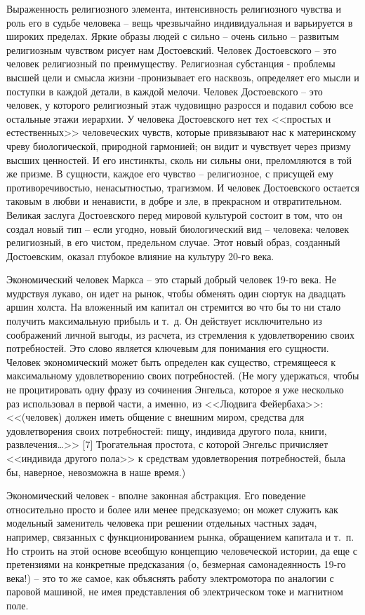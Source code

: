 \documentclass{book}
\begin{document}
Выраженность религиозного элемента, интенсивность рели­гиозного чувства и роль его в судьбе человека -- вещь чрезвы­чайно индивидуальная и варьируется в широких пределах. Яр­кие образы людей с сильно -- очень сильно -- развитым религи­озным чувством рисует нам Достоевский. Человек Достоев­ского -- это человек религиозный по преимуществу.  Религиоз­ная субстанция - проблемы высшей цели и смысла жизни -пронизывает его насквозь, определяет его мысли и поступки в каждой детали, в каждой мелочи. Человек Достоевского -- это человек, у которого религиозный этаж чудовищно разрос­ся и подавил собою все остальные этажи иерархии. У человека Достоевского нет тех <<простых и естественных>> человеческих чувств, которые привязывают нас к материнскому чреву био­логической, природной гармонией; он видит и чувствует через призму высших ценностей. И его инстинкты, сколь ни сильны они, преломляются в той же призме. В сущности, каждое его чувство -- религиозное, с присущей ему противоречивостью, ненасытностью, трагизмом. И человек 
Достоевского остается таковым в любви и ненависти, в добре и зле, в прекрасном и отвратительном. Великая заслуга Достоевского перед мировой культурой состоит в том, что он создал новый тип -- если угодно, новый биологический вид -- человека: человек религиозный, в его чистом, предельном случае. Этот новый образ, созданный Достоевским, оказал глубокое влияние на культуру 20-го века.

Экономический человек Маркса -- это старый добрый чело­век 19-го века. Не мудрствуя лукаво, он идет на рынок, чтобы обменять один сюртук на двадцать аршин холста. На вложен­ный им капитал он стремится во что бы то ни стало получить максимальную прибыль и т.~д. Он действует исключительно из соображений личной выгоды, из расчета, из стремления к удов­летворению своих потребностей.  Это слово является ключевым для понимания его сущности. Человек экономический может быть определен как существо, стремящееся к максимальному удовлетворению своих потребностей. (Не могу удержаться, что­бы не процитировать одну фразу из сочинения Энгельса, кото­рое я уже несколько раз использовал в первой части, а именно, из <<Людвига Фейербаха>>: << (человек) должен иметь обще­ние с внешним миром, средства для удовлетворения своих по­требностей: пищу, индивида другого пола, книги, развлече­ния\ldots>> [7] Трогательная простота, с которой Энгельс причисляет <<индивида другого пола>> к средствам удовлетворения потреб­ностей, была бы, 
наверное, невозможна в наше время.)

Экономический человек - вполне законная абстракция. Его поведение относительно просто и более или менее пред­сказуемо; он может служить как модельный заменитель чело­века при решении отдельных частных задач, например, связанных с функционированием рынка, обращением капитала и т.~п. Но строить на этой основе всеобщую концепцию человеческой истории, да еще с претензиями на конкретные предсказания (о, безмерная самонадеянность 19-го века!) -- это то же самое, как объяснять работу электромотора по аналогии с паровой машиной, не имея представления об электрическом токе и маг­нитном поле.
\end{document}
